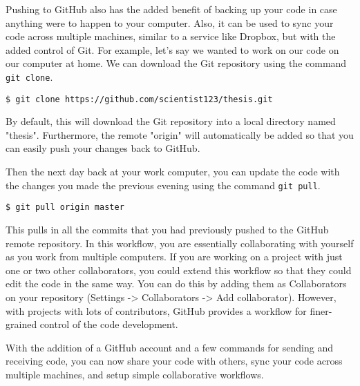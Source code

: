 Pushing to GitHub also has the added benefit of backing up your code in case anything were to happen to your computer.
Also, it can be used to sync your code across multiple machines, similar to a service like Dropbox, but with the added control of Git.
For example, let's say we wanted to work on our code on our computer at home.
We can download the Git repository using the command \verb|git clone|.

\begin{lstlisting}
$ git clone https://github.com/scientist123/thesis.git
\end{lstlisting}

By default, this will download the Git repository into a local directory named "thesis".
Furthermore, the remote "origin" will automatically be added so that you can easily push your changes back to GitHub.

Then the next day back at your work computer, you can update the code with the changes you made the previous evening using the command \verb|git pull|.

\begin{lstlisting}
$ git pull origin master
\end{lstlisting}

This pulls in all the commits that you had previously pushed to the GitHub remote repository.
In this workflow, you are essentially collaborating with yourself as you work from multiple computers.
If you are working on a project with just one or two other collaborators, you could extend this workflow so that they could edit the code in the same way.
You can do this by adding them as Collaborators on your repository (Settings -> Collaborators -> Add collaborator).
However, with projects with lots of contributors, GitHub provides a workflow for finer-grained control of the code development.

With the addition of a GitHub account and a few commands for sending and receiving code, you can now share your code with others, sync your code across multiple machines, and setup simple collaborative workflows.
